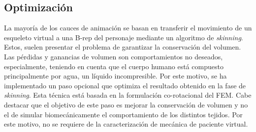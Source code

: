 

 \subsection{Optimización}
\label{posing:optimizacion}


La mayoría de los cauces de animación se basan en transferir el movimiento de un esqueleto virtual a una \acl{B-rep} del personaje mediante un algoritmo de \emph{skinning}. Estos, suelen presentar el problema de garantizar la conservación del volumen. Las pérdidas y ganancias de volumen son comportamientos no deseados, especialmente, teniendo en cuenta que el cuerpo humano está compuesto principalmente por agua, un líquido incompresible. Por este motivo, se ha implementado un paso opcional que optimiza el resultado obtenido en la fase de \emph{skinning}. Esta técnica está basada en la formulación co-rotacional del \ac{FEM}. Cabe destacar que el objetivo de este paso es mejorar la conservación de volumen y no el de simular biomecánicamente el comportamiento de los distintos tejidos. Por este motivo, no se requiere de la caracterización de mecánica de paciente virtual.  




